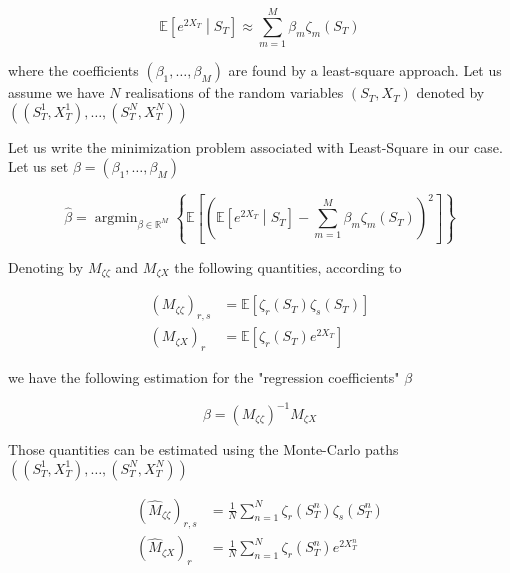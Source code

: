 \documentclass{article}
\DeclareMathOperator*{\argmin}{argmin}
\begin{document}
\begin{equation}
	\mathbb{E}\left[e^{2X_T}\middle| S_T \right] \approx \sum_{m=1}^{M} \beta_m \zeta_m\left(S_T\right)
\end{equation}

\noindent where the coefficients $(\beta_1, \dots, \beta_M)$ are found by a least-square approach. Let us assume we have $N$ realisations of the random variables $(S_T,X_T)$ denoted by $\left((S_T^1,X_T^1),\dots, (S_T^N,X_T^N)\right)$

\noindent Let us write the minimization problem associated with Least-Square in our case. Let us set $\beta = \left(\beta_1, \dots, \beta_M\right)$

\begin{equation}
	\hat{\beta} = \argmin_{\beta \in \mathbb{R}^M}
\left\{\mathbb{E}\left[\left(\mathbb{E}\left[e^{2X_T} \middle| S_T\right] - \sum_{m=1}^M \beta_m \zeta_m\left(S_T\right)\right)^2\right]\right\}
\end{equation}

\noindent Denoting by $M_{\zeta \zeta}$ and $M_{\zeta X}$ the following quantities, according to \cite{Humeau2013}

\begin{equation}
\begin{aligned}
	(M_{\zeta \zeta})_{r,s} &= \mathbb{E}\left[\zeta_r(S_T)\zeta_s(S_T)\right]\\
	(M_{\zeta X})_r &= \mathbb{E}\left[\zeta_r(S_T)e^{2X_T}\right]
\end{aligned}
\end{equation}

\noindent we have the following estimation for the "regression coefficients" $\beta$

\begin{equation}	
	\beta = (M_{\zeta \zeta})^{-1} M_{\zeta X}
\end{equation}

\noindent Those quantities can be estimated using the Monte-Carlo paths $\left((S_T^1,X_T^1),\dots, (S_T^N,X_T^N)\right)$

\begin{equation}
\begin{aligned}
	(\hat{M}_{\zeta \zeta})_{r,s} &= \frac{1}{N} \sum_{n=1}^N \zeta_r(S_T^n)\zeta_s(S_T^n)\\
	(\hat{M}_{\zeta X})_r &= \frac{1}{N} \sum_{n=1}^N \zeta_r(S_T^n)e^{2X_T^n}
\end{aligned}
\end{equation}
\end{document}
